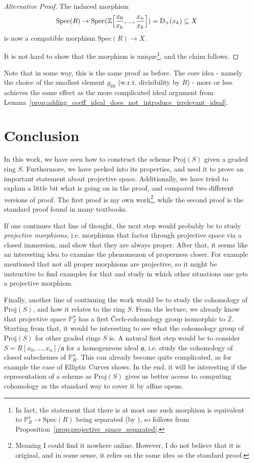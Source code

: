 \documentclass{scrartcl}
\newcommand{\Z}{\mathbb{Z}}
\newcommand{\D}[1]{\mathrm{D}_+(#1)}
\renewcommand{\P}{\mathbb{P}}
\renewcommand{\a}{\mathfrak{a}}
\newcommand{\Spec}{\mathrm{Spec}}
\newcommand{\Proj}{\mathrm{Proj}}
\newcommand{\citestacks}[1]{\cite[\href{https://stacks.math.columbia.edu/tag/#1}{Tag #1}]{stacks}}
\theoremstyle{definition}
\begin{document}
\begin{proof}[Alternative Proof]
    The induced morphism
    \begin{equation*}
        \Spec(R) \to \Spec(\Z\Bigl[ \frac {x_0} {x_k}, ..., \frac {x_n} {x_k} \Bigr]) = \D{x_k} \subseteq X
    \end{equation*}
    is now a compatible morphism $\Spec(R) \to X$.
    
    It is not hard to show that the morphism is unique\footnote{In fact, the statement that there is at most one such morphism is equivalent to $\P_R^n \to \Spec(R)$ being separated (by \citestacks{01L0}), so follows from Proposition~\ref{prop:projective_space_separated}.}, and the claim follows.
\end{proof}
Note that in some way, this is the same proof as before.
The core idea - namely the choice of the smallest element $g_{k0}$ (w.r.t. divisibility by $R$) - more or less achieves the same effect as the more complicated ideal argument from Lemma~\ref{prop:adding_coeff_ideal_does_not_introduce_irrelevant_ideal}.

\section*{Conclusion}
In this work, we have seen how to construct the scheme $\Proj(S)$ given a graded ring $S$.
Furthermore, we have peeked into its properties, and used it to prove an important statement about projective space.
Additionally, we have tried to explain a little bit what is going on in the proof, and compared two different versions of proof.
The first proof is my own work\footnote{Meaning I could find it nowhere online. However, I do not believe that it is original, and in some sense, it relies on the same idea as the standard proof.}, while the second proof is the standard proof found in many textbooks.

If one continues that line of thought, the next step would probably be to study \emph{projective morphisms}, i.e. morphisms that factor through projective space via a closed immersion, and show that they are always proper.
After that, it seems like an interesting idea to examine the phenomenon of properness closer.
For example \cite{hartshorne} mentioned that not all proper morphisms are projective, so it might be instructive to find examples for that and study in which other situations one gets a projective morphism.

Finally, another line of continuing the work would be to study the cohomology of $\Proj(S)$, and how it relates to the ring $S$.
From the lecture, we already know that projective space $\P_\Z^n$ has a first \v{C}ech-cohomology group isomorphic to $\Z$.
Starting from that, it would be interesting to see what the cohomology group of $\Proj(S)$ for other graded rings $S$ is.
A natural first step would be to consider $S = R[x_0, ..., x_n]/\a$ for a homogeneous ideal $\a$, i.e. study the cohomology of closed subschemes of $\P_R^n$.
This can already become quite complicated, as for example the case of Elliptic Curves shows.
In the end, it will be interesting if the representation of a scheme as $\Proj(S)$ gives us better access to computing cohomology as the standard way to cover it by affine opens. 

\printbibliography
\end{document}
